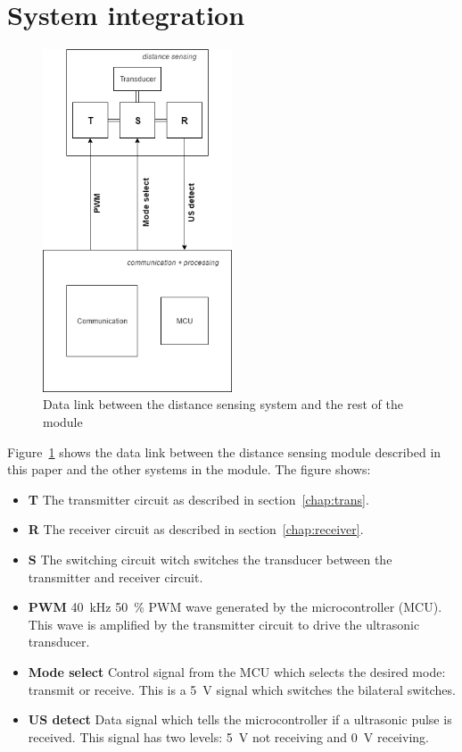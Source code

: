 \section{System integration}
\label{sec:sys_int}

\begin{figure}[H]
\centering
\includegraphics[width=0.5\textwidth]{Figures/integration.png}
\caption{Data link between the distance sensing system and the rest of the module}
\label{fig:int}
\end{figure}

Figure~\ref{fig:int} shows the data link between the distance sensing module described in this paper and the other systems in the module.
The figure shows:

\begin{itemize}
\item
\textbf{T} The transmitter circuit as described in section~\ref{chap:trans}.
\item
\textbf{R} The receiver circuit as described in section~\ref{chap:receiver}.
\item
\textbf{S} The switching circuit witch switches the transducer between the transmitter and receiver circuit.
\item
\textbf{PWM} \SI{40}{\kilo\hertz} \SI{50}{\percent} PWM wave generated by the microcontroller (MCU). This wave is amplified by the transmitter circuit to drive the ultrasonic transducer.
\item
\textbf{Mode select} Control signal from the MCU which selects the desired mode: transmit or receive. This is a \SI{5}{\volt} signal which switches the bilateral switches.
\item
\textbf{US detect} Data signal which tells the microcontroller if a ultrasonic pulse is received. This signal has two levels: \SI{5}{\volt} not receiving and \SI{0}{\volt} receiving.
\end{itemize}

